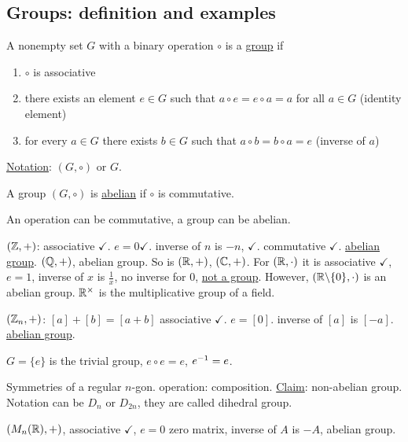 \documentclass[]{article}
\begin{document}
\subsection{Groups: definition and examples}

\begin{definition}
	A nonempty set $G$ with a binary operation $\circ$ is a \ul{group} if
	\begin{enumerate}
		\item $\circ$ is associative
		\item there exists an element $e\in G$ such that $a\circ e = e\circ a = a$ for all $a\in G$ (identity element)
		\item for every $a\in G$ there exists $b\in G$ such that $a\circ b = b\circ a = e$ (inverse of $a$)
	\end{enumerate}
	\ul{Notation}: $(G,\circ)$ or $G$.
\end{definition}
\begin{definition}
	A group $(G,\circ)$ is \ul{abelian} if $\circ$ is commutative.
\end{definition}
\begin{remark}
	An operation can be commutative, a group can be abelian.
\end{remark}
\begin{example}
	$(\mathbb{Z},+)$: associative $\checkmark$. $e=0 \checkmark$. inverse of $n$ is $-n$, $\checkmark$. commutative $\checkmark$. \ul{abelian group}.
	$(\mathbb{Q}, +)$, abelian group. So is $(\mathbb{R},+)$, $(\mathbb{C},+)$. For $(\mathbb{R},\cdot)$ it is associative $\checkmark$, $e=1$, inverse of $x$ is $\frac{1}{x}$, no inverse for 0, \ul{not a group}. However, $(\mathbb{R}\backslash \{0\},\cdot)$ is an abelian group. $\mathbb{R}^\times$ is the multiplicative group of a field.
\end{example}
\begin{example}
	$(\mathbb{Z}_n,+)$: $[a]+[b] = [a+b]$ associative $\checkmark$. $e=[0]$. inverse of $[a]$ is $[-a]$. \ul{abelian group}.
\end{example}
\begin{example}
	$G = \{e\}$ is the trivial group, $e\circ e = e$, $e^{-1} = e$.
\end{example}
\begin{example}
	Symmetries of a regular $n$-gon. operation: composition. \ul{Claim}: non-abelian group. Notation can be $D_n$ or $D_{2n}$, they are called dihedral group.
\end{example}
\begin{example}
	$(M_n(\mathbb{R}),+)$, associative $\checkmark$, $e=0$ zero matrix, inverse of $A$ is $-A$, abelian group.
\end{example}
\end{document}
